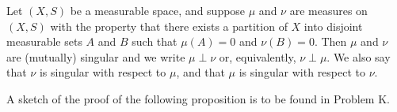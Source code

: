 Let $(X, S)$ be a measurable space, and suppose $\mu$ and $\nu$ are measures on $(X, S)$ with the property that there exists a partition of $X$ into disjoint measurable sets $A$ and $B$ such that $\mu(A) = 0$ and $\nu(B) = 0$. Then $\mu$ and $\nu$ are (mutually) singular and we write $\mu \perp \nu$ or, equivalently, $\nu \perp \mu$. We also say that $\nu$ is singular with respect to $\mu$, and that $\mu$ is singular with respect to $\nu$.

A sketch of the proof of the following proposition is to be found in Problem K.
